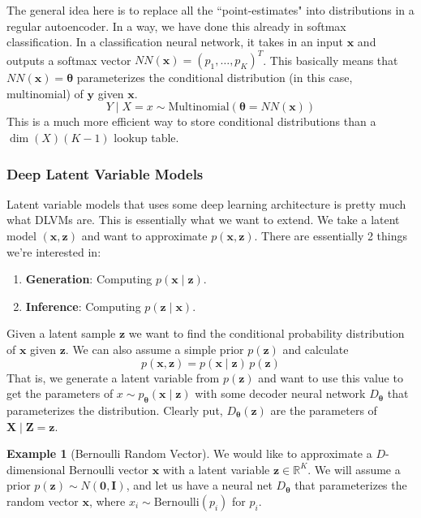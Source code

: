 \documentclass{article}
\theoremstyle{definition}
\newtheorem{example}{Example}[section]
\theoremstyle{remark}
\theoremstyle{definition}
\begin{document}
The general idea here is to replace all the ``point-estimates" into distributions in a regular autoencoder. In a way, we have done this already in softmax classification. In a classification neural network, it takes in an input $\mathbf{x}$ and outputs a softmax vector $NN(\mathbf{x}) =(p_1, \ldots, p_K)^T$. This basically means that $NN(\mathbf{x}) = \boldsymbol{\theta}$ parameterizes the conditional distribution (in this case, multinomial) of $\mathbf{y}$ given $\mathbf{x}$. 
\[Y \mid X = x \sim \mathrm{Multinomial}(\boldsymbol{\theta} = NN(\mathbf{x}))\]
This is a much more efficient way to store conditional distributions than a $\dim(X) (K - 1)$ lookup table. 

\subsubsection{Deep Latent Variable Models}

Latent variable models that uses some deep learning architecture is pretty much what DLVMs are. This is essentially what we want to extend. We take a latent model $(\mathbf{x}, \mathbf{z})$ and want to approximate $p(\mathbf{x}, \mathbf{z})$. There are essentially 2 things we're interested in: 
\begin{enumerate}
    \item \textbf{Generation}: Computing $p(\mathbf{x} \mid \mathbf{z})$. 
    \item \textbf{Inference}: Computing $p(\mathbf{z} \mid \mathbf{x})$. 
\end{enumerate}
Given a latent sample $\mathbf{z}$ we want to find the conditional probability distribution of $\mathbf{x}$ given $\mathbf{z}$. We can also assume a simple prior $p(\mathbf{z})$ and calculate 
\[p(\mathbf{x}, \mathbf{z}) = p(\mathbf{x} \mid \mathbf{z}) \, p(\mathbf{z}) \]
That is, we generate a latent variable from $p(\mathbf{z})$ and want to use this value to get the parameters of $x \sim p_{\boldsymbol{\theta}} (\mathbf{x} \mid \mathbf{z})$ with some decoder neural network $D_{\boldsymbol{\theta}}$ that parameterizes the distribution. Clearly put, $D_{\boldsymbol{\theta}} (\mathbf{z})$ are the parameters of $\mathbf{X} \mid \mathbf{Z} = \mathbf{z}$. 

\begin{example}[Bernoulli Random Vector] 
    We would like to approximate a $D$-dimensional Bernoulli vector $\mathbf{x}$ with a latent variable $\mathbf{z} \in \mathbb{R}^K$. We will assume a prior $p(\mathbf{z}) \sim N(\mathbf{0}, \mathbf{I})$, and let us have a neural net $D_{\boldsymbol{\theta}}$ that parameterizes the random vector $\mathbf{x}$, where $x_i \sim \mathrm{Bernoulli}(p_i)$ for $p_i$.  
\end{example}
\end{document}
